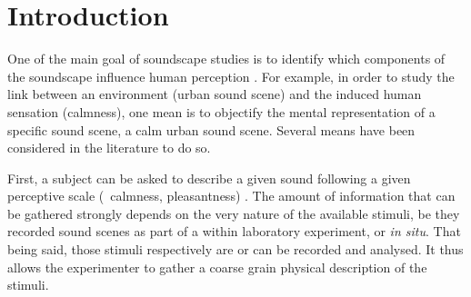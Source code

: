 \documentclass[twoside,twocolumn]{article}
\begin{document}
\setlength{\parindent}{5ex}

\section{Introduction}
\label{sec:intro}


One of the main goal of soundscape studies is to identify which components of the soundscape influence human perception \cite{aletta2016soundscape}. For example, in order to study the link between an environment (urban sound scene) and the induced human sensation (calmness), one mean is to objectify the mental representation of a specific sound scene, a calm urban sound scene. Several means have been considered in the literature to do so.


First, a subject can be asked to describe a given sound following a given perceptive scale (\eg~calmness, pleasantness) \cite{axelsson2005soundscape,davies2013perception,cain2013development}. The amount of information that can be gathered strongly depends on the very nature of the available stimuli, be they recorded sound scenes as part of a within laboratory experiment, or \emph{in situ}. That being said, those stimuli respectively are or can be recorded and analysed. It thus allows the experimenter to gather a coarse grain physical description of the stimuli.

\end{document}
